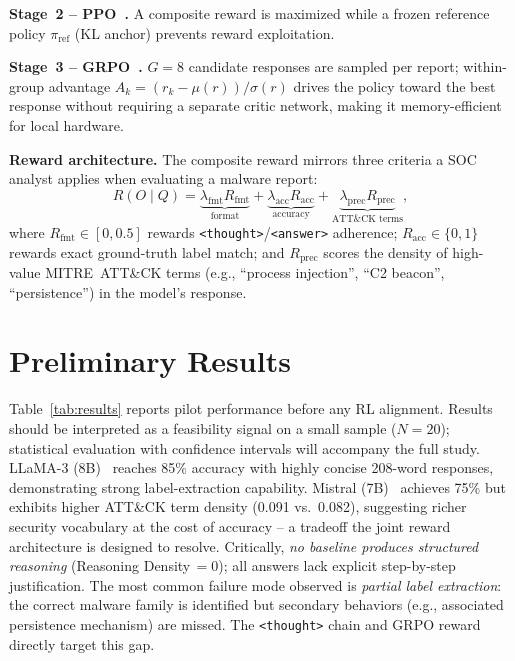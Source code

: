 \documentclass[conference,compsoc]{IEEEtran}
\begin{document}
\textbf{Stage~2 -- PPO~\cite{ppo}.}
A composite reward is maximized while a frozen reference policy
$\pi_\text{ref}$ (KL anchor) prevents reward exploitation.

\textbf{Stage~3 -- GRPO~\cite{grpo}.}
$G{=}8$ candidate responses are sampled per report; within-group advantage
$A_k{=}(r_k{-}\mu(r))/\sigma(r)$ drives the policy toward the best
response without requiring a separate critic network, making it
memory-efficient for local hardware.

\textbf{Reward architecture.}
The composite reward mirrors three criteria a SOC analyst applies when
evaluating a malware report:
\begin{equation}
  R(O\!\mid\! Q)\!=\!
    \underbrace{\lambda_\text{fmt}R_\text{fmt}}_{\text{format}}
  +\underbrace{\lambda_\text{acc}R_\text{acc}}_{\text{accuracy}}
  +\underbrace{\lambda_\text{prec}R_\text{prec}}_{\text{ATT\&CK terms}},
\end{equation}
where $R_\text{fmt}\!\in\![0,0.5]$ rewards \texttt{<thought>}/\texttt{<answer>}
adherence; $R_\text{acc}\!\in\!\{0,1\}$ rewards exact ground-truth label
match; and $R_\text{prec}$ scores the density of high-value MITRE~ATT\&CK
\cite{mitre} terms (e.g., ``process injection'', ``C2 beacon'',
``persistence'') in the model's response.

\section{Preliminary Results}

Table~\ref{tab:results} reports pilot performance before any RL alignment.
Results should be interpreted as a feasibility signal on a small sample
($N{=}20$); statistical evaluation with confidence intervals will accompany
the full study.
LLaMA-3 (8B)~\cite{llama3} reaches 85\% accuracy with highly concise
208-word responses, demonstrating strong label-extraction capability.
Mistral (7B)~\cite{mistral} achieves 75\% but exhibits higher ATT\&CK term
density (0.091 vs.\ 0.082), suggesting richer security vocabulary at the
cost of accuracy -- a tradeoff the joint reward architecture is designed to
resolve.
Critically, \emph{no baseline produces structured reasoning}
(Reasoning Density\,$=\!0$); all answers lack explicit step-by-step
justification.
The most common failure mode observed is \emph{partial label extraction}:
the correct malware family is identified but secondary behaviors
(e.g., associated persistence mechanism) are missed.
The \texttt{<thought>} chain and GRPO reward directly target this gap.
\end{document}
